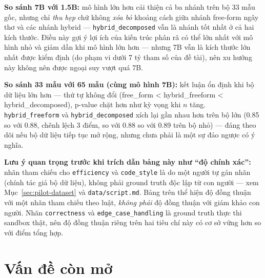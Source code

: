 \documentclass[a4paper,12pt]{report}
\begin{document}
\textbf{So sánh 7B với 1.5B:} mô hình lớn hơn cải thiện cả ba nhánh trên bộ
33 mẫu gốc, nhưng chỉ \emph{thu hẹp} chứ không \emph{xóa bỏ} khoảng cách
giữa nhánh free-form ngây thơ và các nhánh hybrid — \texttt{hybrid\_decomposed}
vẫn là nhánh tốt nhất ở cả hai kích thước. Điều này gợi ý lợi ích của kiến
trúc phân rã có thể lớn nhất với mô hình nhỏ và giảm dần khi mô hình lớn
hơn — nhưng 7B vẫn là kích thước lớn nhất được kiểm định (do phạm vi dưới
7 tỷ tham số của đề tài), nên xu hướng này không nên được ngoại suy vượt
quá 7B.

\textbf{So sánh 33 mẫu với 65 mẫu (cùng mô hình 7B):} kết luận ổn định khi
bộ dữ liệu lớn hơn — thứ tự không đổi (free\_form < hybrid\_freeform <
hybrid\_decomposed), p-value chặt hơn như kỳ vọng khi $n$ tăng.
\texttt{hybrid\_freeform} và \texttt{hybrid\_decomposed} xích lại gần nhau
hơn trên bộ lớn (0.85 so với 0.88, chênh lệch 3 điểm, so với 0.88 so với
0.89 trên bộ nhỏ) — đáng theo dõi nếu bộ dữ liệu tiếp tục mở rộng, nhưng
chưa phải là một sự đảo ngược có ý nghĩa.

\textbf{Lưu ý quan trọng trước khi trích dẫn bảng này như ``độ chính
xác'':} nhãn tham chiếu cho \texttt{efficiency} và \texttt{code\_style} là
do một người tự gán nhãn (chính tác giả bộ dữ liệu), không phải ground
truth độc lập từ con người — xem Mục~\ref{sec:pilot-dataset} và
\texttt{data/script.md}. Bảng trên thể hiện độ đồng thuận với một nhãn
tham chiếu theo luật, \emph{không phải} độ đồng thuận với giám khảo con
người. Nhãn \texttt{correctness} và \texttt{edge\_case\_handling} là ground
truth thực thi sandbox thật, nên độ đồng thuận riêng trên hai tiêu chí này
có cơ sở vững hơn so với điểm tổng hợp.

\section{Vấn đề còn mở}
\label{sec:results-open-items}
\end{document}
